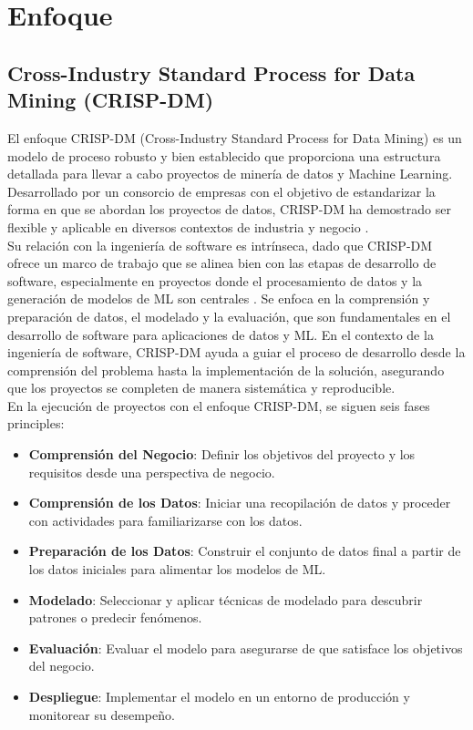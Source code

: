 \documentclass[journal]{IEEEtran}
\begin{document}
\section{Enfoque}

\subsection{Cross-Industry Standard Process for Data Mining (CRISP-DM)}

El enfoque CRISP-DM (Cross-Industry Standard Process for Data Mining) es un modelo de proceso robusto y bien establecido que proporciona una estructura detallada para llevar a cabo proyectos de minería de datos y Machine Learning. Desarrollado por un consorcio de empresas con el objetivo de estandarizar la forma en que se abordan los proyectos de datos, CRISP-DM ha demostrado ser flexible y aplicable en diversos contextos de industria y negocio \cite{datasciencepmWhatCRISP}.\\

Su relación con la ingeniería de software es intrínseca, dado que CRISP-DM ofrece un marco de trabajo que se alinea bien con las etapas de desarrollo de software, especialmente en proyectos donde el procesamiento de datos y la generación de modelos de ML son centrales \cite{Forward2008}. Se enfoca en la comprensión y preparación de datos, el modelado y la evaluación, que son fundamentales en el desarrollo de software para aplicaciones de datos y ML. En el contexto de la ingeniería de software, CRISP-DM ayuda a guiar el proceso de desarrollo desde la comprensión del problema hasta la implementación de la solución, asegurando que los proyectos se completen de manera sistemática y reproducible.\\

En la ejecución de proyectos con el enfoque CRISP-DM, se siguen seis fases principles:

\begin{itemize}
    \item \textbf{Comprensión del Negocio}: Definir los objetivos del proyecto y los requisitos desde una perspectiva de negocio.
    \item \textbf{Comprensión de los Datos}: Iniciar una recopilación de datos y proceder con actividades para familiarizarse con los datos.
    \item \textbf{Preparación de los Datos}: Construir el conjunto de datos final a partir de los datos iniciales para alimentar los modelos de ML.
    \item \textbf{Modelado}: Seleccionar y aplicar técnicas de modelado para descubrir patrones o predecir fenómenos.
    \item \textbf{Evaluación}: Evaluar el modelo para asegurarse de que satisface los objetivos del negocio.
    \item \textbf{Despliegue}: Implementar el modelo en un entorno de producción y monitorear su desempeño.\\
\end{itemize}
\end{document}
